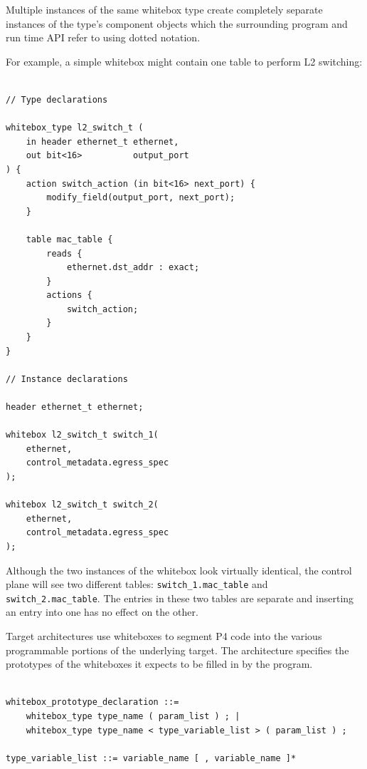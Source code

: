 \documentclass[12pt]{article}
\begin{document}
Multiple instances of the same whitebox type create completely separate
instances of the type's component objects which the surrounding program and
run time API refer to using dotted notation.

For example, a simple whitebox might contain one table to perform L2 switching:

\begin{lstlisting}[style=P4style]

// Type declarations

whitebox_type l2_switch_t (
    in header ethernet_t ethernet,
    out bit<16>          output_port
) {
    action switch_action (in bit<16> next_port) {
        modify_field(output_port, next_port);
    }

    table mac_table {
        reads {
            ethernet.dst_addr : exact;
        }
        actions {
            switch_action;
        }
    }
}

// Instance declarations

header ethernet_t ethernet;

whitebox l2_switch_t switch_1(
    ethernet,
    control_metadata.egress_spec
);

whitebox l2_switch_t switch_2(
    ethernet,
    control_metadata.egress_spec
);

\end{lstlisting}

Although the two instances of the whitebox look virtually identical, the
control plane will see two different tables: \texttt{switch_1.mac_table} and
\texttt{switch_2.mac_table}. The entries in these two tables are separate and
inserting an entry into one has no effect on the other.


Target architectures use whiteboxes to segment P4 code into the various
programmable portions of the underlying target. The architecture specifies
the prototypes of the whiteboxes it expects to be filled in by the program.

\begin{lstlisting}[style=BNFstyle]

whitebox_prototype_declaration ::= 
    whitebox_type type_name ( param_list ) ; |
    whitebox_type type_name < type_variable_list > ( param_list ) ;

type_variable_list ::= variable_name [ , variable_name ]*

\end{lstlisting}
\end{document}

